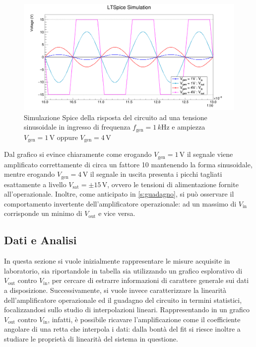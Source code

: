 \documentclass[a4paper,11pt]{article} %
\begin{document}
\begin{figure}[H]
	\centering
	\includegraphics[width=\linewidth]{../Plots/Report_Plots/opamp_spice_1V_4V.png}
	\caption{Simulazione Spice della risposta del circuito ad una tensione sinusoidale in ingresso di frequenza
	$f_{\text{gen}}=1\,\si{k\hertz}$ e ampiezza $V_{\text{gen}}=1\,\si{\volt}$ oppure $V_{\text{gen}}=4\,\si{\volt}$}
	\label{i:opamp_simulation}
\end{figure}

\noindent Dal grafico si evince chiaramente come erogando $V_{\text{gen}}=1\,\si{\volt}$ il segnale viene amplificato
correttamente di circa un fattore 10 mantenendo la forma sinusoidale, mentre erogando $V_{\text{gen}}=4\,\si{\volt}$ il
segnale in uscita presenta i picchi tagliati esattamente a livello $V_{\text{sat}}=\pm 15\,\si{\volt}$, ovvero le
tensioni di alimentazione fornite all'operazionale. Inoltre, come anticipato in  \autoref{s:guadagno}, si può osservare il comportamento invertente
dell'amplificatore operazionale: ad un massimo di $V_{\text{in}}$ corrisponde un minimo di $V_{\text{out}}$ e vice
versa.\\



\subsection{Dati e Analisi}
In questa sezione si vuole inizialmente rappresentare le misure acquisite in laboratorio, sia riportandole in tabella
sia utilizzando un grafico esplorativo di $V_{\text{out}}$ contro $V_{\text{in}}$, per cercare di estrarre informazioni
di carattere generale sui dati a disposizione. Successivamente, si vuole invece caratterizzare la linearità
dell'amplificatore operazionale ed il guadagno del circuito in termini statistici, focalizzandosi sullo studio di interpolazioni
lineari. Rappresentando in un grafico $V_{\text{out}}$ contro $V_{\text{in}}$, infatti, è possibile ricavare
l'amplificazione come il coefficiente angolare di una retta che interpola i dati: dalla bontà del fit si riesce inoltre a
studiare le proprietà di linearità del sistema in questione.
\end{document}
